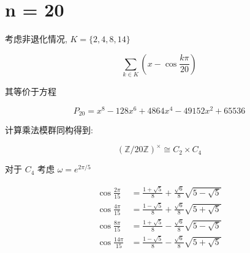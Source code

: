 \chapter{n = 20}\label{ch:cos20}


考虑非退化情况, $K = \{2, 4, 8, 14\}$

$$
\sum_{k∈K}\left(x - \cos\frac{kπ}{20}\right)
$$

其等价于方程

$$
P_{20} = x^8 - 128x^6 + 4864x^4 - 49152x^2 + 65536
$$

计算乘法模群同构得到:

$$
(\mathbb{Z}/20\mathbb{Z})^× ≅ C_2×C_4
$$


对于 $C_4$ 考虑 $ω = e^{2π/5}$


$$
\begin{aligned}
\cos\frac{2π}{15}&=\frac{1+\sqrt{5}}{8}+\frac{\sqrt{6}}{8}\sqrt{5-\sqrt{5}}\\
\cos\frac{4π}{15}&=\frac{1-\sqrt{5}}{8}+\frac{\sqrt{6}}{8}\sqrt{5+\sqrt{5}}\\
\cos\frac{8π}{15}&=\frac{1+\sqrt{5}}{8}-\frac{\sqrt{6}}{8}\sqrt{5-\sqrt{5}}\\
\cos\frac{14π}{15}&=\frac{1-\sqrt{5}}{8}-\frac{\sqrt{6}}{8}\sqrt{5+\sqrt{5}}\\
\end{aligned}
$$
